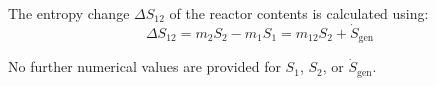 The entropy change \( \Delta S_{12} \) of the reactor contents is calculated using:  
\[
\Delta S_{12} = m_2 S_2 - m_1 S_1 = m_{12} S_2 + \dot{S}_{\text{gen}}
\]  

No further numerical values are provided for \( S_1 \), \( S_2 \), or \( \dot{S}_{\text{gen}} \).